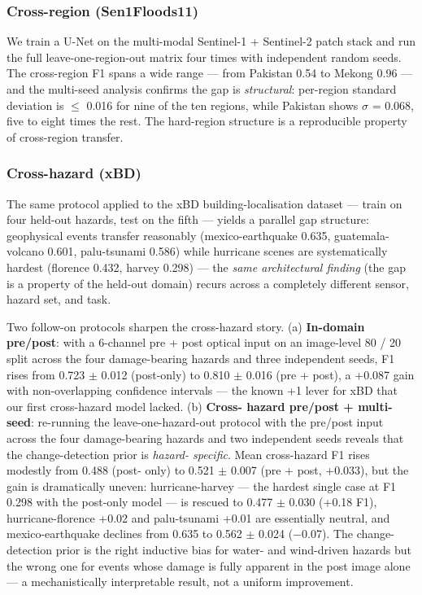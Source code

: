 \documentclass[sn-nature,lineno]{sn-jnl}
\theoremstyle{thmstyleone}
\theoremstyle{thmstyletwo}
\theoremstyle{thmstylethree}
\begin{document}
\subsubsection{Cross-region (Sen1Floods11)}\label{cross-region-sen1floods11}

We train a U-Net on the multi-modal Sentinel-1 + Sentinel-2 patch stack and
run the full leave-one-region-out matrix four times with independent random
seeds. The cross-region F1 spans a wide range --- from Pakistan 0.54 to Mekong
0.96 --- and the multi-seed analysis confirms the gap is \emph{structural}: per-region
standard deviation is $\leq$ 0.016 for nine of the ten regions, while Pakistan
shows $\sigma$ = 0.068, five to eight times the rest. The hard-region structure is a
reproducible property of cross-region transfer.

\subsubsection{Cross-hazard (xBD)}\label{cross-hazard-xbd}

The same protocol applied to the xBD building-localisation dataset --- train on
four held-out hazards, test on the fifth --- yields a parallel gap structure:
geophysical events transfer reasonably (mexico-earthquake 0.635, guatemala-
volcano 0.601, palu-tsunami 0.586) while hurricane scenes are systematically
hardest (florence 0.432, harvey 0.298) --- the \emph{same architectural finding} (the
gap is a property of the held-out domain) recurs across a completely different
sensor, hazard set, and task.

Two follow-on protocols sharpen the cross-hazard story. (a) \textbf{In-domain
pre/post}: with a 6-channel pre + post optical input on an image-level
80 / 20 split across the four damage-bearing hazards and three independent
seeds, F1 rises from 0.723 $\pm$ 0.012 (post-only) to 0.810 $\pm$ 0.016 (pre + post),
a +0.087 gain with non-overlapping confidence intervals --- the known +1 lever
for xBD that our first cross-hazard model lacked. (b) \textbf{Cross-
hazard pre/post + multi-seed}: re-running the leave-one-hazard-out protocol
with the pre/post input across the four damage-bearing hazards and two
independent seeds reveals that the change-detection prior is \emph{hazard-
specific}. Mean cross-hazard F1 rises modestly from 0.488 (post-
only) to 0.521 $\pm$ 0.007 (pre + post, +0.033), but the gain is dramatically
uneven: hurricane-harvey --- the hardest single case at F1 0.298 with the
post-only model --- is rescued to 0.477 $\pm$ 0.030 (+0.18 F1), hurricane-florence
+0.02 and palu-tsunami +0.01 are essentially neutral, and mexico-earthquake
declines from 0.635 to 0.562 $\pm$ 0.024 ($-$0.07). The change-detection prior is
the right inductive bias for water- and wind-driven hazards but the wrong one
for events whose damage is fully apparent in the post image alone --- a
mechanistically interpretable result, not a uniform improvement.
\end{document}
